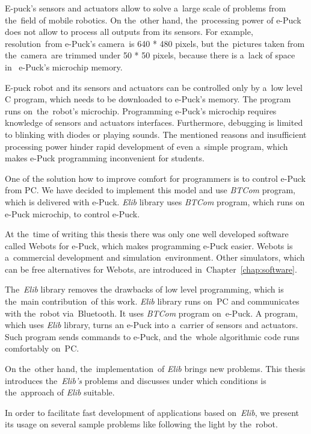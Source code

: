   E-puck's sensors and actuators allow to solve a~large scale of problems from the~field of mobile robotics. 
  On the~other hand, the~processing power of e-Puck does not allow to 
  process all outputs from its sensors. For example, resolution~from e-Puck's camera~is 640 * 480 pixels,
  but the~pictures taken from the~camera~are trimmed under 50 * 50 pixels, because there is a~lack of space in~
   e-Puck's microchip memory.
   
  E-puck robot and its sensors and actuators can be controlled only by a~low level C program,
  which needs to be downloaded to e-Puck's memory. The program runs on~the~robot's microchip.
  Programming e-Puck's microchip requires knowledge of sensors and actuators interfaces.
  Furthermore, debugging is limited to blinking with diodes or playing sounds.
  The mentioned reasons and insufficient processing power hinder rapid development 
  of even a~simple program, 
  which makes e-Puck programming inconvenient for students.

  One of the solution how to improve comfort for programmers is to control e-Puck from PC. 
  We have decided to implement this model and use {\it BTCom} program, which is delivered with e-Puck.
  {\it Elib} library uses {\it BTCom} program, which runs on e-Puck microchip, to control e-Puck.
  
  At the~time of writing this thesis there was only one well developed software called Webots for e-Puck, 
  which makes programming e-Puck easier.  
  Webots is a~commercial development and simulation~environment.
  Other simulators, which can be free alternatives for Webots, are introduced in~Chapter~\ref{chap:software}.
  
  The~{\it Elib} library removes the drawbacks of low level programming, 
  which is the~main contribution~of this work.
  {\it Elib} library runs on~PC and communicates with the~robot via~Bluetooth. 
  It uses {\it BTCom} program on~e-Puck.
  A program, which uses {\it Elib} library, 
  turns an e-Puck into a~carrier of sensors and actuators. 
  Such program sends commands to e-Puck,
  and the~whole algorithmic code runs comfortably on~PC.
  
  On the~other hand, the~implementation~of {\it Elib} brings new problems.
  This thesis introduces the~{\it Elib's} problems and discusses 
  under which conditions is the~approach of {\it Elib} suitable.	

  In order to facilitate fast development of applications based on~{\it Elib},
  we present its usage on several sample problems like following the light by the~robot.


